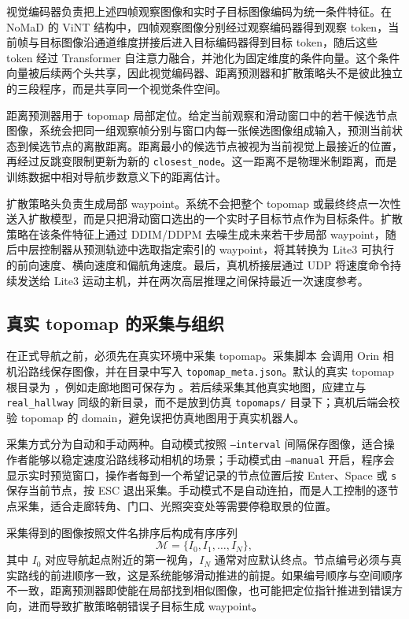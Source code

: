 视觉编码器负责把上述四帧观察图像和实时子目标图像编码为统一条件特征。在 NoMaD 的 ViNT 结构中，四帧观察图像分别经过观察编码器得到观察 token，当前帧与目标图像沿通道维度拼接后进入目标编码器得到目标 token，随后这些 token 经过 Transformer 自注意力融合，并池化为固定维度的条件向量。这个条件向量被后续两个头共享，因此视觉编码器、距离预测器和扩散策略头不是彼此独立的三段程序，而是共享同一个视觉条件空间。

距离预测器用于 topomap 局部定位。给定当前观察和滑动窗口中的若干候选节点图像，系统会把同一组观察帧分别与窗口内每一张候选图像组成输入，预测当前状态到候选节点的离散距离。距离最小的候选节点被视为当前视觉上最接近的位置，再经过反跳变限制更新为新的 \texttt{closest\_node}。这一距离不是物理米制距离，而是训练数据中相对导航步数意义下的距离估计。

扩散策略头负责生成局部 waypoint。系统不会把整个 topomap 或最终终点一次性送入扩散模型，而是只把滑动窗口选出的一个实时子目标节点作为目标条件。扩散策略在该条件特征上通过 DDIM/DDPM 去噪生成未来若干步局部 waypoint，随后中层控制器从预测轨迹中选取指定索引的 waypoint，将其转换为 Lite3 可执行的前向速度、横向速度和偏航角速度。最后，真机桥接层通过 UDP 将速度命令持续发送给 Lite3 运动主机，并在两次高层推理之间保持最近一次速度参考。

\subsection{真实 topomap 的采集与组织}

在正式导航之前，必须先在真实环境中采集 topomap。采集脚本  会调用 Orin 相机沿路线保存图像，并在目录中写入 \texttt{topomap\_meta.json}。默认的真实 topomap 根目录为 ，例如走廊地图可保存为 。若后续采集其他真实地图，应建立与 \texttt{real\_hallway} 同级的新目录，而不是放到仿真 \texttt{topomaps/} 目录下；真机后端会校验 topomap 的 domain，避免误把仿真地图用于真实机器人。

采集方式分为自动和手动两种。自动模式按照 \texttt{--interval} 间隔保存图像，适合操作者能够以稳定速度沿路线移动相机的场景；手动模式由 \texttt{--manual} 开启，程序会显示实时预览窗口，操作者每到一个希望记录的节点位置后按 Enter、Space 或 \texttt{s} 保存当前节点，按 ESC 退出采集。手动模式不是自动连拍，而是人工控制的逐节点采集，适合走廊转角、门口、光照突变处等需要停稳取景的位置。

采集得到的图像按照文件名排序后构成有序序列
\begin{equation}
\mathcal{M}=\{I_0,I_1,\ldots,I_N\},
\end{equation}
其中 $I_0$ 对应导航起点附近的第一视角，$I_N$ 通常对应默认终点。节点编号必须与真实路线的前进顺序一致，这是系统能够滑动推进的前提。如果编号顺序与空间顺序不一致，距离预测器即使能在局部找到相似图像，也可能把定位指针推进到错误方向，进而导致扩散策略朝错误子目标生成 waypoint。

